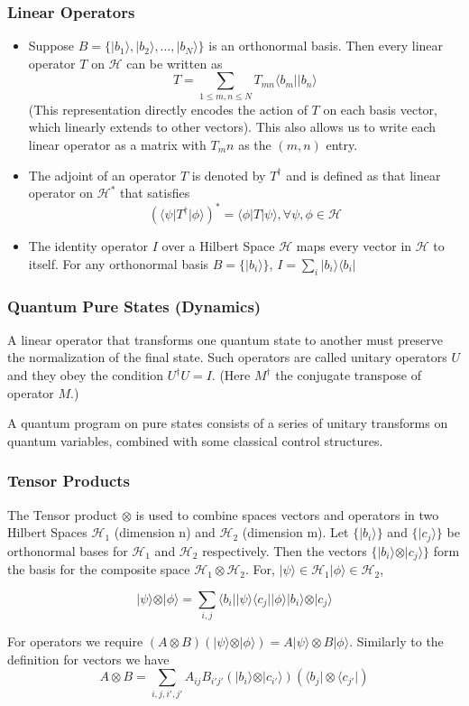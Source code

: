 \documentclass{beamer}
\newcommand{\bra}[1]{\langle #1 \vert}
\newcommand{\ket}[1]{\vert #1 \rangle}
\begin{document}
\begin{frame}
  \frametitle{Linear Operators}
\begin{itemize}    \item Suppose $B = \{\ket{b_1},\ket{b_2},\dots,\ket{b_N}\}$ is an orthonormal basis. Then every linear operator $T$ on $\mathcal{H}$ can be written as
  $$
  T = \sum\limits_{1\le m,n \le N} T_{mn}\bra{b_m}\ket{b_n}
  $$
  (This representation directly encodes the action of $T$ on each basis vector, which linearly extends to other vectors). This also allows us to write each linear operator as a matrix with $T_mn$ as the $(m,n)$ entry.

  \item The adjoint of an operator $T$ is denoted by $T^\dagger$ and is defined as that linear operator on $\mathcal{H}^*$ that satisfies
  $$
  (\bra{\psi}T^\dagger \ket{\phi})^*=\bra{\phi}T\ket{\psi}, \forall \psi,\phi \in \mathcal{H}
  $$

\item The identity operator $I$ over a Hilbert Space $\mathcal{H}$ maps every vector in $\mathcal{H}$ to itself. For any orthonormal basis $B=\{\ket{b_i}\}$, $I=\sum\limits_i\ket{b_i}\bra{b_i}$
  \end{itemize}
\end{frame}

\begin{frame}
  \frametitle{Quantum Pure States (Dynamics)}
  A linear operator that transforms one quantum state to another must preserve the normalization of the final state. Such operators are called unitary operators $U$ and they obey the condition $U^{\dagger}U = I$. (Here $M^{\dagger}$ the conjugate transpose of operator $M$.)

  A quantum program on pure states consists of a series of unitary transforms on quantum variables, combined with some classical control structures.
\end{frame}


\begin{frame}
  \frametitle{Tensor Products}
  The Tensor product $\otimes$ is used to combine spaces vectors and operators in two Hilbert Spaces $\mathcal{H}_1$ (dimension n) and $\mathcal{H}_2$ (dimension m). Let $\{\ket{b_i}\}$ and $\{\ket{c_j}\}$ be orthonormal bases for $\mathcal{H}_1$ and $\mathcal{H}_2$ respectively. Then the vectors $\{\ket{b_i}\otimes\ket{c_j}\}$ form the basis for the composite space $\mathcal{H}_1 \otimes \mathcal{H}_2$. For, $\ket{\psi}\in \mathcal{H}_1 \ket{\phi} \in \mathcal{H}_2$,

$$
\ket{\psi}\otimes\ket{\phi} = \sum\limits_{i,j}\bra{b_i}\ket{\psi}\bra{c_j}\ket{\phi}\ket{b_i}\otimes\ket{c_j}
$$

For operators we require $(A \otimes B)(\ket{\psi}\otimes\ket{\phi})=A\ket{\psi}\otimes B\ket{\phi}$. Similarly to the definition for vectors we have
$$
A \otimes B = \sum\limits_{i,j,i',j'} A_{ij}B_{i'j'}(\ket{b_i}\otimes\ket{c_{i'}})(\bra{b_j}\otimes\bra{c_{j'}})
$$
\end{frame}
\end{document}
